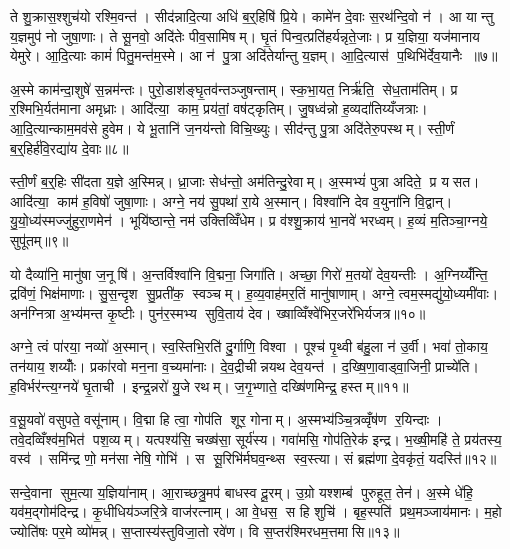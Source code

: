 ते शु॒क्रास॒श्शुच॑यो रश्मि॒वन्त॑। सीद॑न्नादि॒त्या अधि॑ ब॒र्॒हिषि॑ प्रि॒ये। कामे॑न दे॒वाः स॒रथ॑न्दि॒वो न॑। आ यान्तु य॒ज्ञमुप॑ नो जुषा॒णाः। ते सू॒नवो॒ अदि॑तेः पीव॒सामिषम्। घृ॒तं पिन्व॒त्प्रति॑हर्यन्नृते॒जाः। प्र य॒ज्ञिया॒ यज॑मानाय येमुरे। आ॒दि॒त्याः कामं॑ पितु॒मन्त॑म॒स्मे। आ न॑ पु॒त्रा अदि॑तेर्यान्तु य॒ज्ञम्। आ॒दि॒त्यास॑ प॒थिभि॑र्देव॒यानैः ॥७॥

अ॒स्मे काम॑न्दा॒शुषे॑ स॒न्नम॑न्तः। पुरो॒डाश॑ङ्घृ॒तव॑न्तञ्जुषन्ताम्। स्क॒भा॒यत॒ निर्\mbox{}ऋ॑ति॒ सेध॒ताम॑तिम्। प्र र॒श्मिभि॒र्यत॑माना अमृध्राः। आदि॑त्या॒ काम॒ प्रय॑तां॒ वष॑ट्कृतिम्। जु॒षध्व॑न्नो ह॒व्यदा॑तिय्यँजत्राः। आ॒दि॒त्यान्काम॒मव॑से हुवेम। ये भू॒तानि॑ ज॒नय॑न्तो विचि॒ख्युः। सीद॑न्तु पु॒त्रा अदि॑तेरु॒पस्थम्। स्ती॒र्णं ब॒र्॒हिर्\mbox{}ह॑वि॒रद्या॑य दे॒वाः॥८॥

स्ती॒र्णं ब॒र्॒हिः सी॑दता य॒ज्ञे अ॒स्मिन्न्। ध्रा॒जाः सेध॑न्तो॒ अम॑तिन्दु॒रेवाम्। अ॒स्मभ्यं॑ पुत्रा अदिते॒ प्र यसत। आदि॑त्या॒ काम॑ ह॒विषो॑ जुषा॒णाः। अग्ने॒ नय॑ सु॒पथा॑ रा॒ये अ॒स्मान्। विश्वा॑नि देव व॒युना॑नि वि॒द्वान्। यु॒यो॒ध्य॑स्मज्जु॑हुरा॒णमेन॑। भूयि॑ष्ठान्ते॒ नम॑ उक्तिव्विँधेम। प्र व॑श्शु॒क्राय॑ भा॒नवे॑ भरध्वम्। ह॒व्यं म॒तिञ्चा॒ग्नये॒ सुपू॑तम्॥९॥

यो दैव्या॑नि॒ मानु॑षा ज॒नूषि॑। अ॒न्तर्विश्वा॑नि वि॒द्मना॒ जिगा॑ति। अच्छा॒ गिरो॑ म॒तयो॑ देव॒यन्तीः। अ॒ग्निय्यँ॑न्ति॒ द्रवि॑णं॒ भिक्ष॑माणाः। सु॒स॒न्दृश सु॒प्रती॑क॒ स्वञ्चम्। ह॒व्य॒वाह॑मर॒तिं मानु॑षाणाम्। अग्ने॒ त्वम॒स्मद्यु॑यो॒ध्यमी॑वाः। अन॑ग्नित्रा अ॒भ्य॑मन्त कृ॒ष्टीः। पुन॑र॒स्मभ्य सुवि॒ताय॑ देव। ख्षाव्विँश्वे॑भिर॒जरे॑भिर्यजत्र॥१०॥

अग्ने॒ त्वं पा॑रया॒ नव्यो॑ अ॒स्मान्। स्व॒स्तिभि॒रति॑ दु॒र्गाणि॒ विश्वा। पूश्च॑ पृ॒थ्वी ब॑हु॒ला न॑ उ॒र्वी। भवा॑ तो॒काय॒ तन॑याय॒ शय्योँः। प्रका॑रवो मन॒ना व॒च्यमा॑नाः। दे॒व॒द्रीचीन्नयथ देव॒यन्त॑। द॒ख्षि॒णा॒वाड्वा॒जिनी॒ प्राच्ये॑ति। ह॒विर्भर॑न्त्य॒ग्नये॑ घृ॒ताची। इन्द्र॒न्नरो॑ यु॒जे रथम्। ज॒गृ॒भ्णाते॒ दख्षि॑णमिन्द्र॒ हस्तम्॥११॥

व॒सू॒यवो॑ वसुपते॒ वसू॑नाम्। वि॒द्मा हि त्वा॒ गोप॑ति शूर॒ गोनाम्। अ॒स्मभ्य॑ञ्चि॒त्रव्वृँष॑ण र॒यिन्दाः। तवे॒दव्विँश्व॑म॒भित॑ पश॒व्यम्। यत्पश्य॑सि॒ चख्ष॑सा॒ सूर्य॑स्य। गवा॑मसि॒ गोप॑ति॒रेक॑ इन्द्र। भ॒ख्षी॒महि॑ ते॒ प्रय॑तस्य॒ वस्व॑। समि॑न्द्र णो॒ मन॑सा नेषि॒ गोभि॑। स सू॒रिभि॑र्मघव॒न्थ्स स्व॒स्त्या। सं ब्रह्म॑णा दे॒वकृ॑तं॒ यदस्ति॑॥१२॥

सन्दे॒वाना सुम॒त्या य॒ज्ञिया॑नाम्। आ॒राच्छत्रु॒मप॑ बाधस्व दू॒रम्। उ॒ग्रो यश्शम्ब॑ पुरुहूत॒ तेन॑। अ॒स्मे धे॑हि॒ यव॑म॒द्गोम॑दिन्द्र। कृ॒धीधिय॑ञ्जरि॒त्रे वाज॑रत्नाम्। आ वे॒धस॒ स हि शुचि॑। बृह॒स्पति॑ प्रथ॒मञ्जाय॑मानः। म॒हो ज्योति॑षः पर॒मे व्यो॑मन्न्। स॒प्तास्य॑स्तुविजा॒तो रवे॑ण। वि स॒प्तर॑श्मिरधम॒त्तमासि॥१३॥

